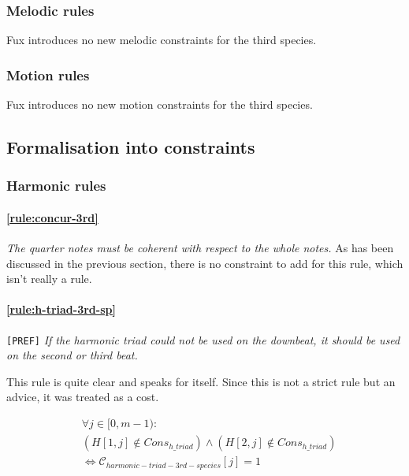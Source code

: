 \subsubsection{Melodic rules}
Fux introduces no new melodic constraints for the third species.
\subsubsection{Motion rules}
Fux introduces no new motion constraints for the third species.

\subsection{Formalisation into constraints}
\subsubsection{Harmonic rules}
\paragraph{\hspace{.5cm}\ref{rule:concur-3rd}} \textit{The quarter notes must be coherent with respect to the whole notes.}
As has been discussed in the previous section, there is no constraint to add for this rule, which isn't really a rule.

\paragraph{\hspace{.6cm}\ref{rule:h-triad-3rd-sp}} \texttt{[PREF]} \textit{If the harmonic triad could not be used on the downbeat, it should be used on the second or third beat.}    

    This rule is quite clear and speaks for itself. Since this is not a strict rule but an advice, it was treated as a cost.

    \begin{equation} \begin{aligned}
            &\forall j \in [0, m-1) \colon \\
            &(H[1, j] \notin Cons_{h\_triad}) \land  (H[2, j] \notin Cons_{h\_triad})\\
            &\iff \mathcal{C}_{harmonic-triad-3rd-species}[j] = 1       
    \end{aligned} \end{equation}




